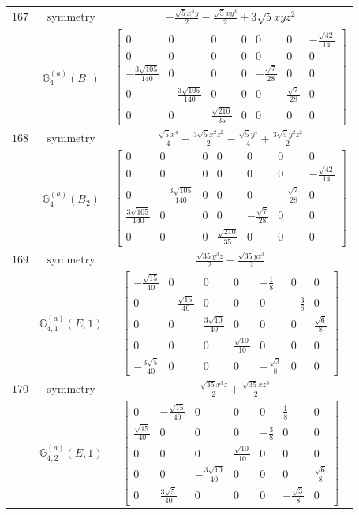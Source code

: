 \documentclass[fleqn,8pt,landscape]{jsarticle}
\begin{document}
\begin{longtable}{ccc}
$ 167 $ & $ \text{symmetry} $ & $ - \frac{\sqrt{5} x^{3} y}{2} - \frac{\sqrt{5} x y^{3}}{2} + 3 \sqrt{5} x y z^{2} $ \\
$  $ & $ \mathbb{G}_{4}^{(a)}(B_{1}) $ & $ \begin{bmatrix} 0 & 0 & 0 & 0 & 0 & 0 & - \frac{\sqrt{42}}{14} \\ 0 & 0 & 0 & 0 & 0 & 0 & 0 \\ - \frac{3 \sqrt{105}}{140} & 0 & 0 & 0 & - \frac{\sqrt{7}}{28} & 0 & 0 \\ 0 & - \frac{3 \sqrt{105}}{140} & 0 & 0 & 0 & \frac{\sqrt{7}}{28} & 0 \\ 0 & 0 & \frac{\sqrt{210}}{35} & 0 & 0 & 0 & 0 \end{bmatrix} $ \\ \hline
$ 168 $ & $ \text{symmetry} $ & $ \frac{\sqrt{5} x^{4}}{4} - \frac{3 \sqrt{5} x^{2} z^{2}}{2} - \frac{\sqrt{5} y^{4}}{4} + \frac{3 \sqrt{5} y^{2} z^{2}}{2} $ \\
$  $ & $ \mathbb{G}_{4}^{(a)}(B_{2}) $ & $ \begin{bmatrix} 0 & 0 & 0 & 0 & 0 & 0 & 0 \\ 0 & 0 & 0 & 0 & 0 & 0 & - \frac{\sqrt{42}}{14} \\ 0 & - \frac{3 \sqrt{105}}{140} & 0 & 0 & 0 & - \frac{\sqrt{7}}{28} & 0 \\ \frac{3 \sqrt{105}}{140} & 0 & 0 & 0 & - \frac{\sqrt{7}}{28} & 0 & 0 \\ 0 & 0 & 0 & \frac{\sqrt{210}}{35} & 0 & 0 & 0 \end{bmatrix} $ \\ \hline
$ 169 $ & $ \text{symmetry} $ & $ \frac{\sqrt{35} y^{3} z}{2} - \frac{\sqrt{35} y z^{3}}{2} $ \\
$  $ & $ \mathbb{G}_{4,1}^{(a)}(E,1) $ & $ \begin{bmatrix} - \frac{\sqrt{15}}{40} & 0 & 0 & 0 & - \frac{1}{8} & 0 & 0 \\ 0 & - \frac{\sqrt{15}}{40} & 0 & 0 & 0 & - \frac{3}{8} & 0 \\ 0 & 0 & \frac{3 \sqrt{10}}{40} & 0 & 0 & 0 & \frac{\sqrt{6}}{8} \\ 0 & 0 & 0 & \frac{\sqrt{10}}{10} & 0 & 0 & 0 \\ - \frac{3 \sqrt{5}}{40} & 0 & 0 & 0 & - \frac{\sqrt{3}}{8} & 0 & 0 \end{bmatrix} $ \\ \hline
$ 170 $ & $ \text{symmetry} $ & $ - \frac{\sqrt{35} x^{3} z}{2} + \frac{\sqrt{35} x z^{3}}{2} $ \\
$  $ & $ \mathbb{G}_{4,2}^{(a)}(E,1) $ & $ \begin{bmatrix} 0 & - \frac{\sqrt{15}}{40} & 0 & 0 & 0 & \frac{1}{8} & 0 \\ \frac{\sqrt{15}}{40} & 0 & 0 & 0 & - \frac{3}{8} & 0 & 0 \\ 0 & 0 & 0 & \frac{\sqrt{10}}{10} & 0 & 0 & 0 \\ 0 & 0 & - \frac{3 \sqrt{10}}{40} & 0 & 0 & 0 & \frac{\sqrt{6}}{8} \\ 0 & \frac{3 \sqrt{5}}{40} & 0 & 0 & 0 & - \frac{\sqrt{3}}{8} & 0 \end{bmatrix} $ \\ \hline

\end{longtable}
\end{document}
